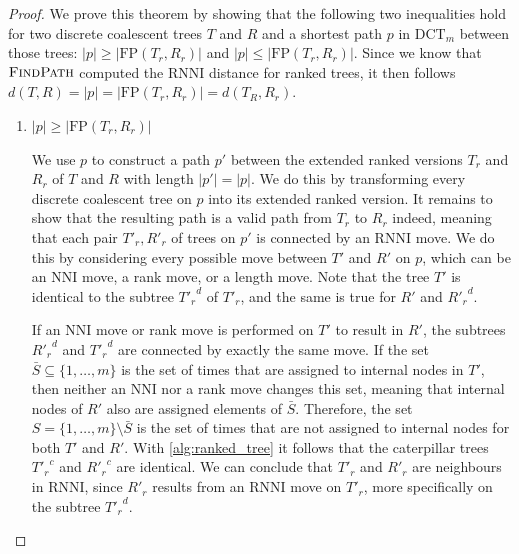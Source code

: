 \documentclass[11pt]{amsart}
\newcommand{\rnni}{\mathrm{RNNI}}
\newcommand{\findpath}{\textsc{FindPath}}
\newcommand{\nni}{\mathrm{NNI}}
\newcommand{\fp}{\mathrm{FP}}
\newcommand{\dct}{\mathrm{DCT}}
\begin{document}
\begin{proof}
	We prove this theorem by showing that the following two inequalities hold for two discrete coalescent trees $T$ and $R$ and a shortest path $p$ in $\dct_m$ between those trees: $|p| \geq |\fp(T_r,R_r)|$ and $|p| \leq |\fp(T_r,R_r)|$.
	Since we know that $\findpath$ computed the $\rnni$ distance for ranked trees, it then follows $d(T,R) = |p| = |\fp(T_r,R_r)| = d(T_R,R_r)$.

	\begin{enumerate}
		\item $|p| \geq |\fp(T_r,R_r)|$

		We use $p$ to construct a path $p'$ between the extended ranked versions $T_r$ and $R_r$ of $T$ and $R$ with length $|p'| = |p|$.
		We do this by transforming every discrete coalescent tree on $p$ into its extended ranked version.
		It remains to show that the resulting path is a valid path from $T_r$ to $R_r$ indeed, meaning that each pair $T'_r, R'_r$ of trees on $p'$ is connected by an $\rnni$ move.
		We do this by considering every possible move between $T'$ and $R'$ on $p$, which can be an $\nni$ move, a rank move, or a length move.
		Note that the tree $T'$ is identical to the subtree ${T'_r}^d$ of $T'_r$, and the same is true for $R'$ and ${R'_r}^d$.
		
		If an $\nni$ move or rank move is performed on $T'$ to result in $R'$, the subtrees ${R'_r}^d$ and ${T'_r}^d$ are connected by exactly the same move.
		If the set $\bar{S} \subseteq \{1, \ldots, m\}$ is the set of times that are assigned to internal nodes in $T'$, then neither an $\nni$ nor a rank move changes this set, meaning that internal nodes of $R'$ also are assigned elements of $\bar S$.
		Therefore, the set $S = \{1, \ldots, m\} \setminus \bar S$ is the set of times that are not assigned to internal nodes for both $T'$ and $R'$.
		With \autoref{alg:ranked_tree} it follows that the caterpillar trees ${T'_r}^c$ and ${R'_r}^c$ are identical.
		We can conclude that $T'_r$ and $R'_r$ are neighbours in $\rnni$, since $R'_r$ results from an $\rnni$ move on $T'_r$, more specifically on the subtree ${T'_r}^d$.


\end{enumerate}
\end{proof}
\end{document}
